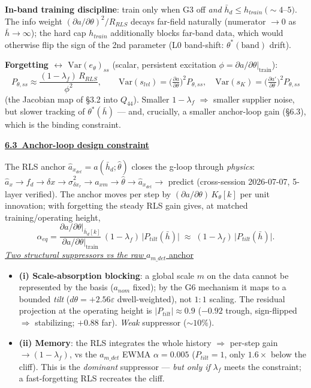 \documentclass[11pt,a4paper,fontset=none]{ctexart}
\newcommand{\hd}[1]{\par\medskip\noindent\underline{\textbf{#1}}\par\nobreak\vspace{0.2ex}}
\newcommand{\adet}{a_{x_{det}}}
\begin{document}
\textbf{In-band training discipline}: train only when G3 off \emph{and} $\bar h_d \le h_{train}\ (\sim\!4$--$5)$. The info weight $(\partial a/\partial\theta)^2/R_{RLS}$ decays far-field naturally (numerator $\to0$ as $\bar h\!\to\!\infty$); the hard cap $h_{train}$ additionally blocks far-band data, which would otherwise flip the sign of the 2nd parameter (L0 band-shift: $\theta^\ast(\text{band})$ drift).

\textbf{Forgetting $\leftrightarrow$ $\mathrm{Var}(e_\theta)_{ss}$} (scalar, persistent excitation $\phi=\partial a/\partial\theta|_{\text{train}}$):
\[ P_{\theta,ss} \approx \frac{(1-\lambda_f)\,R_{RLS}}{\phi^2}, \qquad
   \mathrm{Var}(s_{lvl}) = \Big(\tfrac{\partial a}{\partial\theta}\Big)^{\!2}\!P_{\theta,ss},\quad
   \mathrm{Var}(s_K) = \Big(\tfrac{\partial a'}{\partial\theta}\Big)^{\!2}\!P_{\theta,ss} \]
(the Jacobian map of \S3.2 into $Q_{44}$). Smaller $1-\lambda_f$ $\Rightarrow$ smaller supplier noise, but slower tracking of $\theta^\ast(\bar h)$ --- and, crucially, a smaller anchor-loop gain (\S6.3), which is the binding constraint.

\hd{6.3\ Anchor-loop design constraint}
The RLS anchor $\hat\adet=a(\bar h_d;\hat\theta)$ closes the g-loop through \emph{physics}: $\hat a_x\!\to\!f_d\!\to\!\delta x\!\to\!\hat\sigma^2_{\delta x_r}\!\to\!a_{xm}\!\to\!\hat\theta\!\to\!\hat\adet\!\to$ predict (cross-session 2026-07-07, 5-layer verified). The anchor moves per step by $(\partial a/\partial\theta)\,K_\theta[k]$ per unit innovation; with forgetting the steady RLS gain gives, at matched training/operating height,
\[ \alpha_{eq} = \frac{\partial a/\partial\theta|_{\bar h_d[k]}}{\partial a/\partial\theta|_{\text{train}}}\,(1-\lambda_f)\,\big|P_{tilt}(\bar h)\big|
   \;\approx\; (1-\lambda_f)\,\big|P_{tilt}(\bar h)\big|. \]
\underline{\textit{Two structural suppressors vs the raw }$a_{m\_det}$\underline{ anchor}}
\begin{itemize}[leftmargin=1.4em,itemsep=1pt,topsep=1pt]
\item \textbf{(i) Scale-absorption blocking}: a global scale $m$ on the data cannot be represented by the basis ($a_{nom}$ fixed); by the G6 mechanism it maps to a bounded \emph{tilt} ($d\theta{=}{+}2.56\varepsilon$ dwell-weighted), not $1{:}1$ scaling. The residual projection at the operating height is $|P_{tilt}|\!\approx\!0.9$ ($-0.92$ trough, sign-flipped $\Rightarrow$ stabilizing; $+0.88$ far). \emph{Weak} suppressor ($\sim\!10\%$).
\item \textbf{(ii) Memory}: the RLS integrates the whole history $\Rightarrow$ per-step gain $\to(1-\lambda_f)$, vs the $a_{m\_det}$ EWMA $\alpha{=}0.005$ ($P_{tilt}{=}1$, only $1.6\times$ below the cliff). This is the \emph{dominant} suppressor --- \emph{but only if} $\lambda_f$ meets the constraint; a fast-forgetting RLS recreates the cliff.
\end{itemize}
\end{document}
